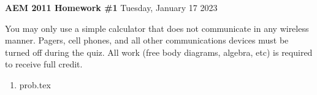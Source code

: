 \documentclass{article}
\begin{document}

\vspace{1cm}

\noindent
\textbf{AEM 2011 Homework \#1}
\hfill Tuesday, January 17 2023

\vspace{.3cm}

You may only use a simple calculator that does not communicate in any
wireless manner. Pagers, cell phones, and all other communications
devices must be turned off during the quiz. All work (free body
diagrams, algebra, etc) is required to receive full credit.

\noindent
\begin{enumerate}
  \item {prob.tex}
\end{enumerate}
\end{document}

